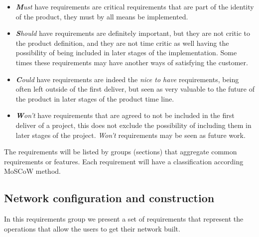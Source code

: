 \begin{itemize}
    \item \textit{\textbf{M}ust} have requirements are critical requirements that are part of the identity of the product, they must by all means be implemented.
    \item \textit{\textbf{S}hould} have requirements are definitely important, but they are not critic to the product definition, and they are not time critic as well having the possibility of being included in later stages of the implementation. Some times these requirements may have another ways of satisfying the customer.
    \item \textit{\textbf{C}ould} have requirements are indeed the \textit{nice to have} requirements, being often left outside of the first deliver, but seen as very valuable to the future of the product in later stages of the product time line.
    \item \textit{\textbf{W}on't} have requirements that are agreed to not be included in the first deliver of a project, this does not exclude the possibility of including them in later stages of the project. \textit{Won't} requirements may be seen as future work.
\end{itemize}

The requirements will be listed by groups (sections) that aggregate common requirements or features. Each requirement will have a classification according MoSCoW method.

\subsection{Network configuration and construction}

In this requirements group we present a set of requirements that represent the operations that allow the users to get their network built.

